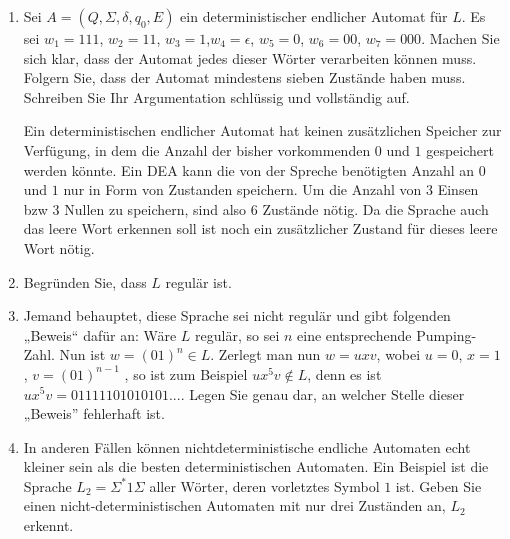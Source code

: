 \documentclass{lehramt-informatik-aufgabe}
\begin{document}
\begin{enumerate}


\item Sei $A = (Q, \Sigma, \delta, q_0 , E)$ ein deterministischer
endlicher Automat für $L$. Es sei $w_1 = 111$, $w_2 = 11$, $w_3 = 1$,$ w_4
= \epsilon$, $w_5 = 0$, $w_6 = 00$, $w_7 = 000$. Machen Sie sich klar,
dass der Automat jedes dieser Wörter verarbeiten können muss. Folgern
Sie, dass der Automat mindestens sieben Zustände haben muss. Schreiben
Sie Ihr Argumentation schlüssig und vollständig auf.

\begin{liAntwort}
Ein deterministischen endlicher Automat hat keinen zusätzlichen Speicher
zur Verfügung, in dem die Anzahl der bisher vorkommenden $0$ und $1$
gespeichert werden könnte. Ein DEA kann die von der Spreche benötigten
Anzahl an $0$ und $1$ nur in Form von Zustanden speichern. Um die Anzahl
von 3 Einsen bzw 3 Nullen zu speichern, sind also 6 Zustände nötig. Da
die Sprache auch das leere Wort erkennen soll ist noch ein zusätzlicher
Zustand für dieses leere Wort nötig.
\end{liAntwort}


\item Begründen Sie, dass $L$ regulär ist.

\begin{liAntwort}

\end{liAntwort}


\item Jemand behauptet, diese Sprache sei nicht regulär und gibt
folgenden „Beweis“ dafür an: Wäre $L$ regulär, so sei $n$ eine
entsprechende Pumping-Zahl. Nun ist $w = (01)^n \in L$. Zerlegt man nun
$w = uxv$, wobei $u = 0$, $x = 1$, $v = (01)^{n-1}$ , so ist zum Beispiel
$ux^5 v \notin L$, denn es ist $ux^5 v = 01111101010101$.... Legen Sie
genau dar, an welcher Stelle dieser „Beweis” fehlerhaft ist.


\item In anderen Fällen können nichtdeterministische endliche Automaten
echt kleiner sein als die besten deterministischen Automaten. Ein
Beispiel ist die Sprache $L_2 = \Sigma^* 1 \Sigma$ aller Wörter, deren
vorletztes Symbol $1$ ist. Geben Sie einen nicht-deterministischen
Automaten mit nur drei Zuständen an, $L_2$ erkennt.


\end{enumerate}
\end{document}
